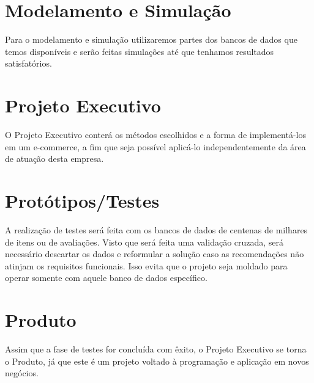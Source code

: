 \section{Modelamento e Simulação} %
\label{sec:modelamento_e_simula_o}


Para o modelamento e simulação utilizaremos partes dos bancos de dados que temos disponíveis e serão feitas simulações até que tenhamos resultados satisfatórios.

\section{Projeto Executivo} %
\label{sec:projeto_executivo}


O Projeto Executivo conterá os métodos escolhidos e a forma de implementá-los em um e-commerce, a fim que seja possível aplicá-lo independentemente da área de atuação desta empresa.

\section{Protótipos/Testes} %
\label{sec:prot_tipos_testes}


A realização de testes será feita com os bancos de dados de centenas de milhares de itens ou de avaliações. Visto que será feita uma validação cruzada, será necessário descartar os dados e reformular a solução caso as recomendações não atinjam os requisitos funcionais. Isso evita que o projeto seja moldado para operar somente com aquele banco de dados específico.

\section{Produto} %
\label{sec:produto}


Assim que a fase de testes for concluída com êxito, o Projeto Executivo se torna o Produto, já que este é um projeto voltado à programação e aplicação em novos negócios.